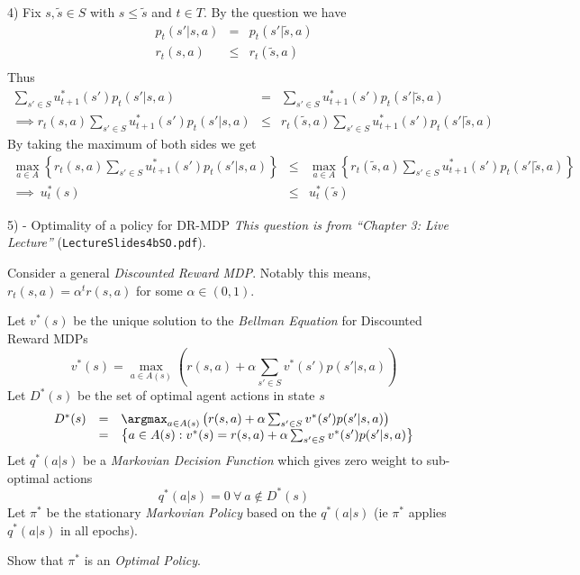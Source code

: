\documentclass[11pt,a4paper]{article}
\begin{document}
\begin{answer}{4)}
  Fix $s,\tilde{s}\in S$ with $s\leq\tilde{s}$ and $t\in T$. By the question we have
  \[\begin{array}{rcl}
    p_t(s'|s,a)&=&p_t(s'|\tilde{s},a)\\
    r_t(s,a)&\leq&r_t(\tilde{s},a)\\
  \end{array}\]
  Thus
  \[\begin{array}{rcl}
    \sum_{s'\in S}u_{t+1}^*(s')p_t(s'|s,a)&=&\sum_{s'\in S}u_{t+1}^*(s')p_t(s'|\tilde{s},a)\\
    \implies r_t(s,a)\sum_{s'\in S}u_{t+1}^*(s')p_t(s'|s,a)&\leq&r_t(\tilde{s},a)\sum_{s'\in S}u_{t+1}^*(s')p_t(s'|\tilde{s},a)
  \end{array}\]
  By taking the maximum of both sides we get
  \[\begin{array}{rcl}
    \max_{a\in A}\left\{r_t(s,a)\sum_{s'\in S}u_{t+1}^*(s')p_t(s'|s,a)\right\}&\leq&\max_{a\in A}\left\{r_t(\tilde{s},a)\sum_{s'\in S}u_{t+1}^*(s')p_t(s'|\tilde{s},a)\right\}\\
    \implies\ u_t^*(s)&\leq&u_t^*(\tilde{s})
  \end{array}\]
\end{answer}

\newpage
\begin{question}{5) - Optimality of a policy for DR-MDP}
  \textit{This question is from ``Chapter 3: Live Lecture''} (\texttt{LectureSlides4bSO.pdf}).
  \par Consider a general \textit{Discounted Reward MDP}. Notably this means, $r_t(s,a)=\alpha^tr(s,a)$ for some $\alpha\in(0,1)$.
  \par Let $v^*(s)$ be the unique solution to the \textit{Bellman Equation} for Discounted Reward MDPs
  \[ v^*(s)=\max_{a\in A(s)}\left(r(s,a)+\alpha\sum_{s'\in S}v^*(s')p(s'|s,a)\right) \]
  Let $D^*(s)$ be the set of optimal agent actions in state $s$
  \[\begin{array}{rcl}
  D^*(s)&=&\argmax_{a\in A(s)}\left(r(s,a)+\alpha\sum_{s'\in S}v^*(s')p(s'|s,a)\right)\\
  &=&\left\{a\in A(s):v^*(s)=r(s,a)+\alpha\sum_{s'\in S}v^*(s')p(s'|s,a)\right\}
  \end{array}\]
  Let $q^*(a|s)$ be a \textit{Markovian Decision Function} which gives zero weight to sub-optimal actions
  \[ q^*(a|s)=0\ \forall\ a\not\in D^*(s) \]
  Let $\pi^*$ be the stationary \textit{Markovian Policy} based on the $q^*(a|s)$ (ie $\pi^*$ applies $q^*(a|s)$ in all epochs).
  \par Show that $\pi^*$ is an \textit{Optimal Policy}.
\end{question}
\end{document}
